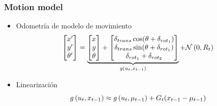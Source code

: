 \begin{frame}
	\frametitle{Motion model}
	
	\begin{itemize}
		\item Odometría de modelo de movimiento
		\begin{equation*}
			\begin{bmatrix}
				x^{\prime} \\
				y^{\prime} \\
				\theta^{\prime}
			\end{bmatrix} =
			\underbrace{
				\begin{bmatrix}
				x \\
				y \\
				\theta
			\end{bmatrix} +
			\begin{bmatrix}
				\delta_{trans}\cos(\theta+\delta_{rot_{1}}) \\
				\delta_{trans}\sin(\theta+\delta_{rot_{1}}) \\
				\delta_{rot_{1}} + \delta_{rot_{2}}
			\end{bmatrix}
			}_{g\left( u_{t}, x_{t-1} \right)} + \mathcal{N}\left( {0}, {R_{t}} \right)
		\end{equation*}
		\item Linearización
		\begin{equation*}
			g\left( u_{t}, x_{t-1} \right) \approx 			g\left( u_{t}, \mu_{t-1} \right) + G_{t}(x_{t-1}-\mu_{t-1})
		\end{equation*}
	\end{itemize}
	
\end{frame}

